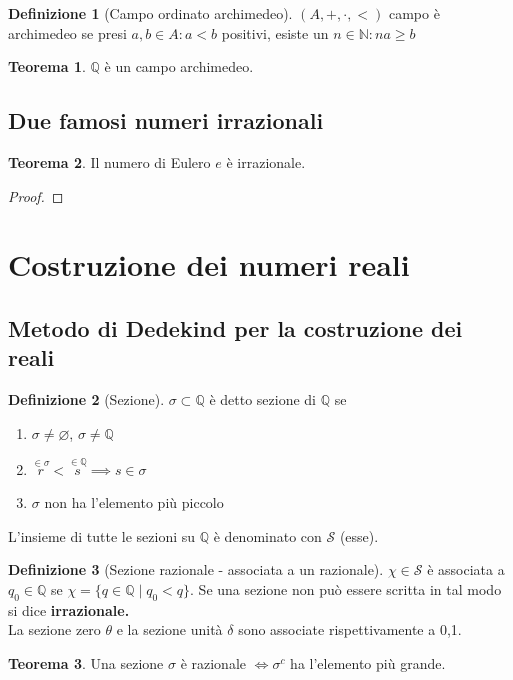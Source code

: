 \documentclass[a4paper,10pt]{article}
\theoremstyle{definition}
\newcommand{\na}{\mathbb{N}} %
\newcommand{\qu}{\mathbb{Q}} %
\theoremstyle{indentdefinition}
\newtheorem{defn}{Definizione}[section]
\theoremstyle{indentpostulate}
\theoremstyle{indenttheorem}
\newtheorem{thm}{Teorema}[section]
\theoremstyle{myremark}
\theoremstyle{indentgeneral}
\begin{document}
\begin{defn}[Campo ordinato archimedeo] $(A,+,\cdot,<)$ campo è archimedeo se presi $a,b\in A:a<b$ positivi, esiste un $n\in\na: na\ge b$
\end{defn}
\begin{thm}
    $\qu$ è un campo archimedeo.
\end{thm}

\subsection{Due famosi numeri irrazionali}
\begin{thm}
    Il numero di Eulero $e$ è irrazionale.
\end{thm}

\begin{proof}
\end{proof}

\pagebreak{}
\section{Costruzione dei numeri reali}
\subsection{Metodo di Dedekind per la costruzione dei reali}
\begin{defn}[Sezione]
    $\sigma\subset \qu$ è detto sezione di $\qu$ se 
    \begin{enumerate}
        \item $\sigma\ne\varnothing$, $\sigma\ne\qu$
        \item $\overset{\in\sigma}{r}<\overset{\in \qu}{s}\implies s\in\sigma$
        \item $\sigma$ non ha l'elemento più piccolo
    \end{enumerate}
    L'insieme di tutte le sezioni su $\qu$ è denominato con $\mathscr{S}$ (esse).
\end{defn}

\begin{defn}[Sezione razionale - associata a un razionale]
    $\chi\in\mathscr{S}$ è associata a $q_0\in\qu$ se $\chi=\{q\in \qu\mid q_0<q\}$. Se una sezione non può essere scritta in tal modo si dice \textbf{irrazionale.}\\
    La sezione zero $\theta$ e la sezione unità $\delta$ sono associate rispettivamente a 0,1.
\end{defn}

\begin{thm}
    Una sezione $\sigma$ è razionale $\iff \sigma^c$ ha l'elemento più grande.
\end{thm}
\end{document}
